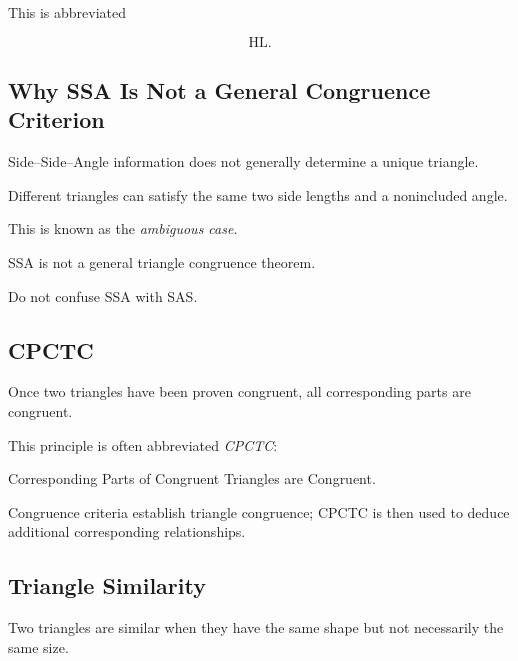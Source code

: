 This is abbreviated

\[ \boxed{\mathrm{HL}.} \]

\subsection{Why SSA Is Not a General Congruence Criterion}
\label{subsec:ssa-ambiguous}

Side--Side--Angle information does not generally determine a unique
triangle.

Different triangles can satisfy the same two side lengths and a
nonincluded angle.

This is known as the \emph{ambiguous case}.

\begin{warningbox}
SSA is not a general triangle congruence theorem.

Do not confuse SSA with SAS.
\end{warningbox}

\subsection{CPCTC}
\label{subsec:cpctc}

Once two triangles have been proven congruent, all corresponding parts are
congruent.

This principle is often abbreviated \emph{CPCTC}:

\begin{center}
Corresponding Parts of Congruent Triangles are Congruent.
\end{center}

Congruence criteria establish triangle congruence; CPCTC is then used to
deduce additional corresponding relationships.

\subsection{Triangle Similarity}
\label{subsec:triangle-similarity}

Two triangles are similar when they have the same shape but not necessarily
the same size.


